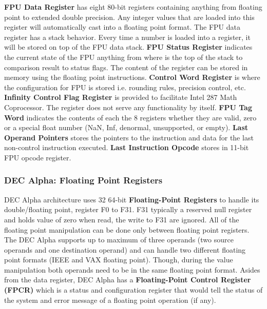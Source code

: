 \documentclass[letterpaper,10pt,titlepage]{article}
\begin{document}
\par
\textbf{FPU Data Register} has eight 80-bit registers containing anything
from floating point to extended double precision. Any integer values that are
loaded into this register will automatically cast into a floating point 
format. The FPU data register has a stack behavior. Every time a number is
loaded into a register, it will be stored on top of the FPU data stack. 
\textbf{FPU Status Register} indicates the current state of the FPU anything
from where is the top of the stack to comparison result to status flags.  
The content of the register can be stored in memory using the floating point
instructions. \textbf{Control Word Register} is where the configuration for 
FPU is stored i.e. rounding rules, precision control, etc. \textbf{Infinity
Control Flag Register} is provided to facilitate Intel 287 Math Coprocessor. 
The register does not serve any functionality by itself. \textbf{FPU Tag Word}
indicates the contents of each the 8 registers whether they are valid, zero or 
a special float number (NaN, Inf, denormal, unsupported, or empty). \textbf{Last 
Operand Pointers} stores the pointers to the instruction and data for the last
non-control instruction executed. \textbf{Last Instruction Opcode} stores in 
11-bit FPU opcode register. 

\subsubsection{DEC Alpha: Floating Point Registers}
DEC Alpha architecture uses 32 64-bit \textbf{Floating-Point Registers} to handle its 
double/floating point, register F0 to F31. F31 typically a reserved null register
and holds value of zero when read, the write to F31 are ignored. All 
of the floating point manipulation can be done only between floating point 
registers. The DEC Alpha supports up to maximum of three operands
(two source operands and one destination operand) and can handle 
two different floating point formats (IEEE and VAX floating point). 
Though, during the value manipulation both operands need to be in the same
floating point format. Asides from the data register, DEC Alpha has a \textbf{Floating-Point 
Control Register (FPCR)} which is a status and configuration register that would
tell the status of the system and error message of a floating point operation (if any).
\par
\end{document}

